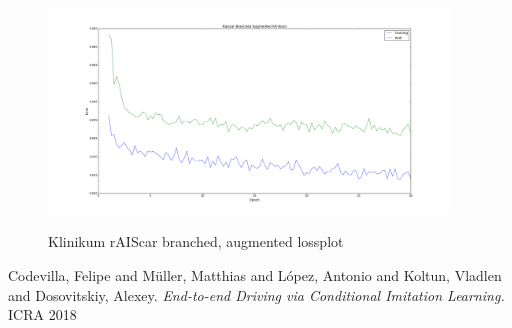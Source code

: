 \documentclass[a4paper]{article}
\begin{document}
\begin{figure}[H]
	\centering
	\includegraphics[width=0.95\textwidth]{figures/raiscar_branched_aug_klinikum_lossplot}
	\label{fig:klinikum_augmented_branched_loss}
	\caption{Klinikum rAIScar branched, augmented lossplot}
\end{figure}
\begin{thebibliography}{9}
Codevilla, Felipe and Müller, Matthias and López, Antonio and Koltun, Vladlen
and Dosovitskiy, Alexey.
\textit{End-to-end Driving via Conditional Imitation Learning.}
ICRA 2018
\end{thebibliography}
\end{document}
